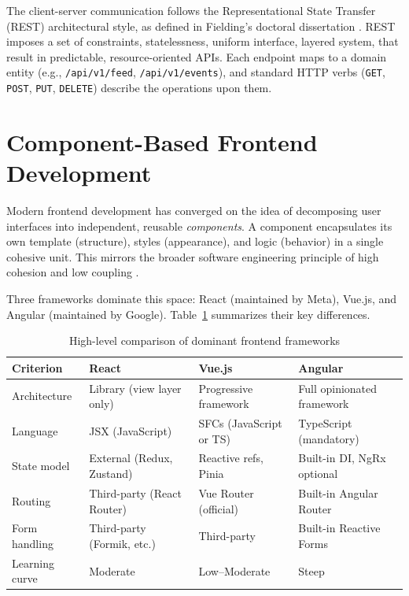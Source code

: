 The client-server communication follows the Representational State Transfer (REST) architectural style, as defined in Fielding's doctoral dissertation \cite{fielding2000rest}. REST imposes a set of constraints, statelessness, uniform interface, layered system, that result in predictable, resource-oriented APIs. Each endpoint maps to a domain entity (e.g., \texttt{/api/v1/feed}, \texttt{/api/v1/events}), and standard HTTP verbs (\texttt{GET}, \texttt{POST}, \texttt{PUT}, \texttt{DELETE}) describe the operations upon them.

\section{Component-Based Frontend Development}

Modern frontend development has converged on the idea of decomposing user interfaces into independent, reusable \textit{components}. A component encapsulates its own template (structure), styles (appearance), and logic (behavior) in a single cohesive unit. This mirrors the broader software engineering principle of high cohesion and low coupling \cite{sommerville2016software}.

Three frameworks dominate this space: React (maintained by Meta), Vue.js, and Angular (maintained by Google). Table~\ref{tab:framework-comparison} summarizes their key differences.

\begin{table}[h]
\centering
\small
\begin{tabularx}{\textwidth}{|l|X|X|X|}
\hline
\textbf{Criterion} & \textbf{React} & \textbf{Vue.js} & \textbf{Angular} \\ \hline
Architecture & Library (view layer only) & Progressive framework & Full opinionated framework \\ \hline
Language & JSX (JavaScript) & SFCs (JavaScript or TS) & TypeScript (mandatory) \\ \hline
State model & External (Redux, Zustand) & Reactive refs, Pinia & Built-in DI, NgRx optional \\ \hline
Routing & Third-party (React Router) & Vue Router (official) & Built-in Angular Router \\ \hline
Form handling & Third-party (Formik, etc.) & Third-party & Built-in Reactive Forms \\ \hline
Learning curve & Moderate & Low--Moderate & Steep \\ \hline
\end{tabularx}
\caption{High-level comparison of dominant frontend frameworks}
\label{tab:framework-comparison}
\end{table}

